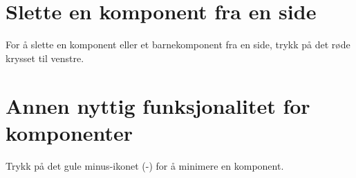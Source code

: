 \section{Slette en komponent fra en side}
For å slette en komponent eller et barnekomponent fra en side, trykk på det røde krysset til venstre. 

\begin{figure}[H]
    \centering
    \label{fig:cms-delete-component}
\end{figure}

\section{Annen nyttig funksjonalitet for komponenter}

Trykk på det gule minus-ikonet (-) for å minimere en komponent.

\begin{figure}[H]
    \centering
    \label{fig:cms-minimize}
\end{figure}


